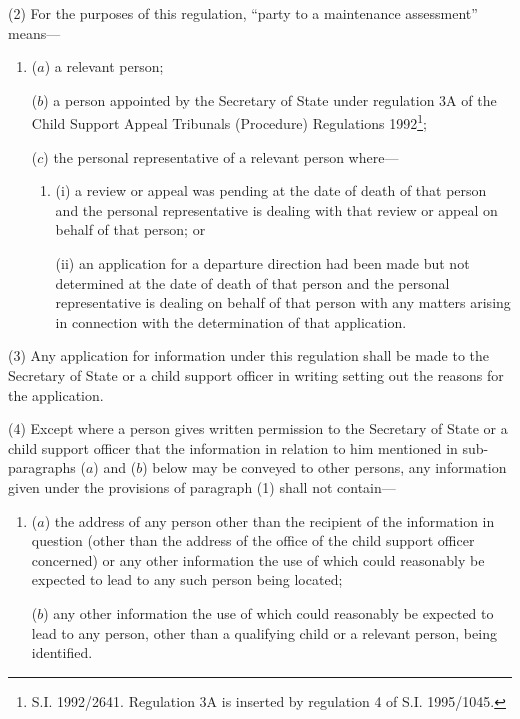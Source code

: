 \documentclass[a4paper,12pt]{article}
\begin{document}
(2) For the purposes of this regulation, “party to a maintenance assessment” means—
\begin{enumerate}\item[]
($a$) a relevant person;

($b$) a person appointed by the Secretary of State under regulation 3A of the Child Support Appeal Tribunals (Procedure) Regulations 1992\footnote{\frenchspacing S.I. 1992/2641. Regulation 3A is inserted by regulation 4 of S.I. 1995/1045.};


($c$) the personal representative of a relevant person where—
\begin{enumerate}\item[]
(i) a review or appeal was pending at the date of death of that person and the personal representative is dealing with that review or appeal on behalf of that person; or

(ii) an application for a departure direction had been made but not determined at the date of death of that person and the personal representative is dealing 
on behalf of that person with any matters arising in connection with the determination of that application.  %
\end{enumerate}
\end{enumerate}

(3) Any application for information under this regulation shall be made to the Secretary of State or a child support officer in writing setting out the reasons for the application.

(4) Except where a person gives written permission to the Secretary of State or a child support officer that the information in relation to him mentioned in sub-paragraphs ($a$) and ($b$) below may be conveyed to other persons, any information given under the provisions of paragraph (1) shall not contain—
\begin{enumerate}\item[]
($a$) the address of any person other than the recipient of the information in question (other than the address of the office of the child support officer concerned) or any other information the use of which could reasonably be expected to lead to any such person being located;

($b$) any other information the use of which could reasonably be expected to lead to any person, other than a qualifying child or a relevant person, being identified.
\end{enumerate}
\end{document}
